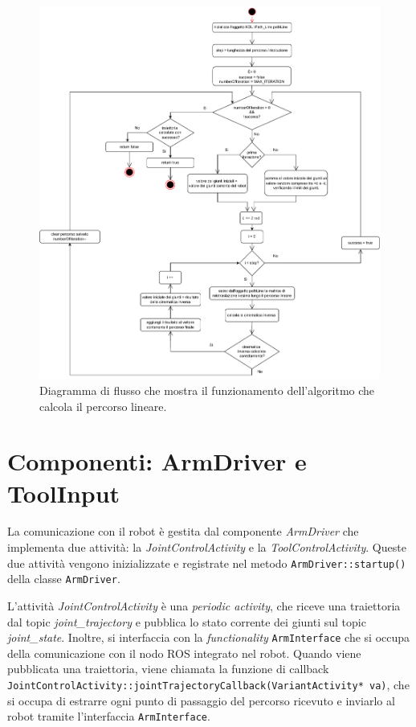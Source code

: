\begin{figure}[ht!]
	\centering
	\includegraphics[width=0.8\linewidth]{./ImageFiles/ComputeLinearTrajectory.drawio.pdf}	\caption{Diagramma di flusso che mostra il funzionamento dell'algoritmo che calcola il percorso lineare.}
	\label{fig:algorithm}
\end{figure}
\clearpage

\section{Componenti: ArmDriver e ToolInput}
La comunicazione con il robot è gestita dal componente \textit{ArmDriver} che implementa due attività: la \textit{JointControlActivity} e la \textit{ToolControlActivity}. Queste due attività vengono inizializzate e registrate nel metodo \texttt{ArmDriver::startup()} della classe \texttt{ArmDriver}. 

L'attività \textit{JointControlActivity} è una \textit{periodic activity}, che riceve una traiettoria dal topic \textit{joint\_trajectory} e pubblica lo stato corrente dei giunti sul topic \textit{joint\_state}. Inoltre, si interfaccia con la \textit{functionality} \texttt{ArmInterface} che si occupa della comunicazione con il nodo ROS integrato nel robot. Quando viene pubblicata una traiettoria, viene chiamata la funzione di callback \texttt{JointControlActivity::jointTrajectoryCallback(VariantActivity* va)}, che si occupa di estrarre ogni punto di passaggio del percorso ricevuto e inviarlo al robot tramite l'interfaccia \texttt{ArmInterface}. 

